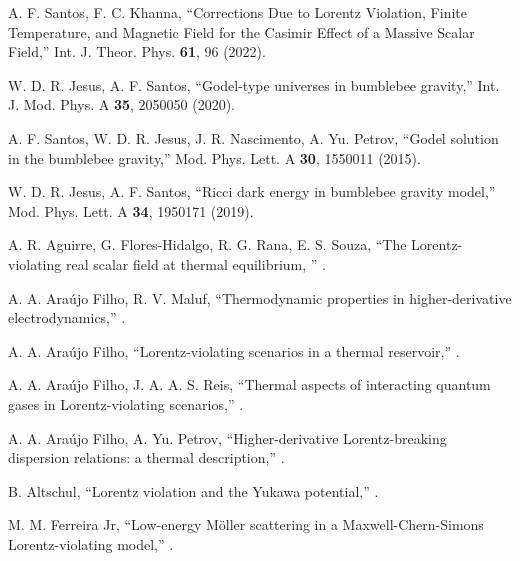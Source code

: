 \documentclass[11pt,showpacs,preprintnumbers,amsmath,amssymb,prd,nofootinbib,superscriptaddress]{revtex4-2}
\begin{document}
\begin{thebibliography}{99}
 A. F. Santos, F. C. Khanna, ``Corrections Due to Lorentz Violation, Finite Temperature, and Magnetic Field for the Casimir Effect of a Massive Scalar Field,''  {Int. J. Theor. Phys. \textbf{61}, 96 (2022)}.

 W. D. R. Jesus, A. F. Santos, ``Godel-type universes in bumblebee gravity,''  {Int. J. Mod. Phys. A \textbf{35}, 2050050 (2020)}.

 A. F. Santos, W. D. R. Jesus, J. R. Nascimento, A. Yu. Petrov, ``Godel solution in the bumblebee gravity,''  {Mod. Phys. Lett. A \textbf{30}, 1550011 (2015)}.

 W. D. R. Jesus, A. F. Santos, ``Ricci dark energy in bumblebee gravity model,''  {Mod. Phys. Lett. A \textbf{34}, 1950171 (2019)}.

 A. R. Aguirre, G. Flores-Hidalgo, R. G. Rana, E. S. Souza, ``The Lorentz-violating real scalar field at thermal equilibrium, '' .

 A. A. Ara\'{u}jo Filho, R. V. Maluf, ``Thermodynamic properties in higher-derivative electrodynamics,'' .

 A. A. Ara\'{u}jo Filho, ``Lorentz-violating scenarios in a thermal reservoir,'' .

 A. A. Ara\'{u}jo Filho, J. A. A. S. Reis, ``Thermal aspects of interacting quantum gases in Lorentz-violating scenarios,'' .

 A. A. Ara\'{u}jo Filho, A. Yu. Petrov, ``Higher-derivative Lorentz-breaking dispersion relations: a thermal description,'' .

 B. Altschul, ``Lorentz violation and the Yukawa potential,'' .

 M. M. Ferreira Jr, ``Low-energy M\"oller scattering in a Maxwell-Chern-Simons Lorentz-violating model,'' .


\end{thebibliography}
\end{document}
